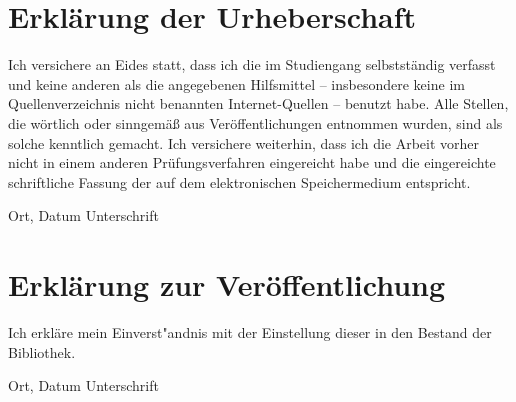 \documentclass[12pt,final,twoside]{report}
\begin{document}



\cleardoublepage

\vspace{2cm}
\chapter*{Erkl\"arung der Urheberschaft}
Ich versichere an Eides statt, dass ich die \trtype{} im Studiengang \trcourseofstudies{} selbstst\"andig verfasst und keine anderen als die angegebenen Hilfsmittel -- insbesondere keine im Quellenverzeichnis nicht benannten Internet-Quellen -- benutzt habe. Alle Stellen, die w\"ortlich oder sinngem\"a{\ss} aus Ver\"offentlichungen entnommen wurden, sind als solche kenntlich gemacht. Ich versichere weiterhin, dass ich die Arbeit vorher nicht in einem anderen Pr\"ufungsverfahren eingereicht habe und die eingereichte schriftliche Fassung der auf dem elektronischen Speichermedium entspricht.

\vspace{4cm}
\noindent Ort, Datum \hfill Unterschrift

\newpage
\thispagestyle{empty}
\hspace{1cm}
\newpage

\vspace{2cm}
\chapter*{Erkl\"arung zur Ver\"offentlichung}
Ich erkl\"are mein Einverst"andnis mit der Einstellung dieser \trtype{} in den Bestand der Bibliothek.

\vspace{4cm}
\noindent Ort, Datum \hfill Unterschrift

\newpage
\thispagestyle{empty}
\hspace{1cm}
\newpage
\end{document}
